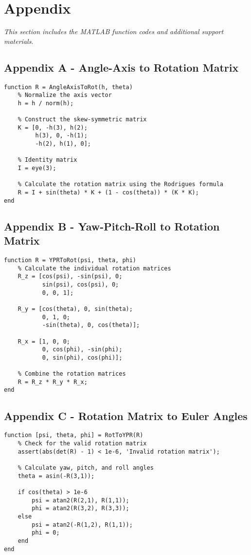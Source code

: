 \section{Appendix}
\textit{This section includes the MATLAB function codes and additional support materials.}

\subsection{Appendix A - Angle-Axis to Rotation Matrix}
\begin{verbatim}
function R = AngleAxisToRot(h, theta)
    % Normalize the axis vector
    h = h / norm(h);
    
    % Construct the skew-symmetric matrix
    K = [0, -h(3), h(2);
         h(3), 0, -h(1);
         -h(2), h(1), 0];
         
    % Identity matrix
    I = eye(3);
    
    % Calculate the rotation matrix using the Rodrigues formula
    R = I + sin(theta) * K + (1 - cos(theta)) * (K * K);
end
\end{verbatim}

\subsection{Appendix B - Yaw-Pitch-Roll to Rotation Matrix}
\begin{verbatim}
function R = YPRToRot(psi, theta, phi)
    % Calculate the individual rotation matrices
    R_z = [cos(psi), -sin(psi), 0;
           sin(psi), cos(psi), 0;
           0, 0, 1];
       
    R_y = [cos(theta), 0, sin(theta);
           0, 1, 0;
           -sin(theta), 0, cos(theta)];
       
    R_x = [1, 0, 0;
           0, cos(phi), -sin(phi);
           0, sin(phi), cos(phi)];
    
    % Combine the rotation matrices
    R = R_z * R_y * R_x;
end
\end{verbatim}

\subsection{Appendix C - Rotation Matrix to Euler Angles}
\begin{verbatim}
function [psi, theta, phi] = RotToYPR(R)
    % Check for the valid rotation matrix
    assert(abs(det(R) - 1) < 1e-6, 'Invalid rotation matrix');
    
    % Calculate yaw, pitch, and roll angles
    theta = asin(-R(3,1));
    
    if cos(theta) > 1e-6
        psi = atan2(R(2,1), R(1,1));
        phi = atan2(R(3,2), R(3,3));
    else
        psi = atan2(-R(1,2), R(1,1));
        phi = 0;
    end
end
\end{verbatim}


